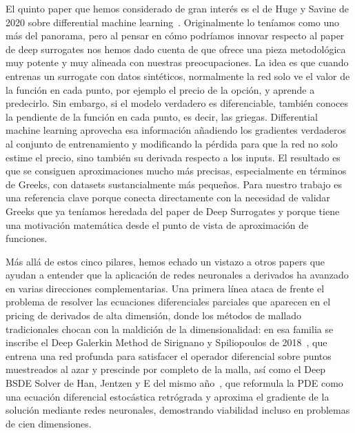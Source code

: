 \documentclass[11pt,a4paper]{article}
\begin{document}
El quinto paper que hemos considerado de gran interés es el de Huge y Savine de 2020 sobre differential machine learning~\cite{huge2020}. Originalmente lo teníamos como uno más del panorama, pero al pensar en cómo podríamos innovar respecto al paper de deep surrogates nos hemos dado cuenta de que ofrece una pieza metodológica muy potente y muy alineada con nuestras preocupaciones. La idea es que cuando entrenas un surrogate con datos sintéticos, normalmente la red solo ve el valor de la función en cada punto, por ejemplo el precio de la opción, y aprende a predecirlo. Sin embargo, si el modelo verdadero es diferenciable, también conoces la pendiente de la función en cada punto, es decir, las griegas. Differential machine learning aprovecha esa información añadiendo los gradientes verdaderos al conjunto de entrenamiento y modificando la pérdida para que la red no solo estime el precio, sino también su derivada respecto a los inputs. El resultado es que se consiguen aproximaciones mucho más precisas, especialmente en términos de Greeks, con datasets sustancialmente más pequeños. Para nuestro trabajo es una referencia clave porque conecta directamente con la necesidad de validar Greeks que ya teníamos heredada del paper de Deep Surrogates y porque tiene una motivación matemática desde el punto de vista de aproximación de funciones.

Más allá de estos cinco pilares, hemos echado un vistazo a otros papers que ayudan a entender que la aplicación de redes neuronales a derivados ha avanzado en varias direcciones complementarias. Una primera línea ataca de frente el problema de resolver las ecuaciones diferenciales parciales que aparecen en el pricing de derivados de alta dimensión, donde los métodos de mallado tradicionales chocan con la maldición de la dimensionalidad: en esa familia se inscribe el Deep Galerkin Method de Sirignano y Spiliopoulos de 2018~\cite{sirignano2018}, que entrena una red profunda para satisfacer el operador diferencial sobre puntos muestreados al azar y prescinde por completo de la malla, así como el Deep BSDE Solver de Han, Jentzen y E del mismo año~\cite{han2018}, que reformula la PDE como una ecuación diferencial estocástica retrógrada y aproxima el gradiente de la solución mediante redes neuronales, demostrando viabilidad incluso en problemas de cien dimensiones.
\end{document}

